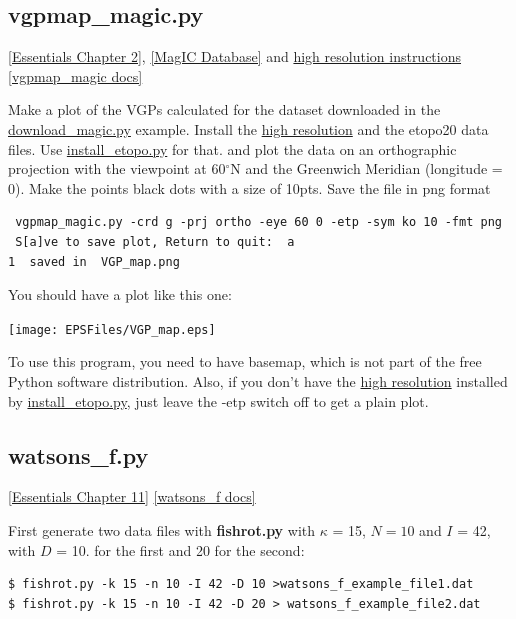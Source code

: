 \documentclass[11pt]{book}
\begin{document}
{{{

\subsection{vgpmap\_magic.py}
\href{http://earthref.org/MAGIC/books/Tauxe/Essentials/WebBook3ch2.html#ch2}{[Essentials Chapter 2]},  \href{#MagICDatabase}{[MagIC Database]} and   \href{#hires}{high resolution instructions}
\href{https://github.com/PmagPy/PmagPy/blob/master/programs/vgpmap_magic.py}{[vgpmap\_magic docs]}

Make a plot of the VGPs calculated for the dataset downloaded in the \href{#download_magic.py}{download\_magic.py} example.  Install the  \href{#hires}{high resolution} and the etopo20 data files. Use \href{#install_etopo.py}{install\_etopo.py}  for that.
and plot the data on an orthographic projection with the viewpoint at 60$^{\circ}$N and the Greenwich Meridian (longitude = 0).  Make the points black dots with a size of 10pts.   Save the file in png format

\begin{verbatim}
 vgpmap_magic.py -crd g -prj ortho -eye 60 0 -etp -sym ko 10 -fmt png
 S[a]ve to save plot, Return to quit:  a
1  saved in  VGP_map.png
\end{verbatim}



You should have a plot like this one:

\texttt{[image: EPSFiles/VGP\_map.eps]}

To use this program, you need to have basemap, which is not part of the free Python software distribution.  Also, if you don't have the  \href{#hires}{high resolution} installed by \href{#install_etopo.py}{install\_etopo.py}, just leave the -etp switch off to get a plain plot.




\subsection{watsons\_f.py}
\href{http://earthref.org/MAGIC/books/Tauxe/Essentials/WebBook3ch11.html#ch11}{[Essentials Chapter 11]}
\href{https://github.com/PmagPy/PmagPy/blob/master/programs/watsons_f.py}{[watsons\_f docs]}

First generate two data files with {\bf fishrot.py} with $\kappa$ = 15, $N=10$ and $I$ = 42, with $D$ = 10. for the first and 20 for the second:

\begin{verbatim}
$ fishrot.py -k 15 -n 10 -I 42 -D 10 >watsons_f_example_file1.dat
$ fishrot.py -k 15 -n 10 -I 42 -D 20 > watsons_f_example_file2.dat
\end{verbatim}

}}}
\end{document}
